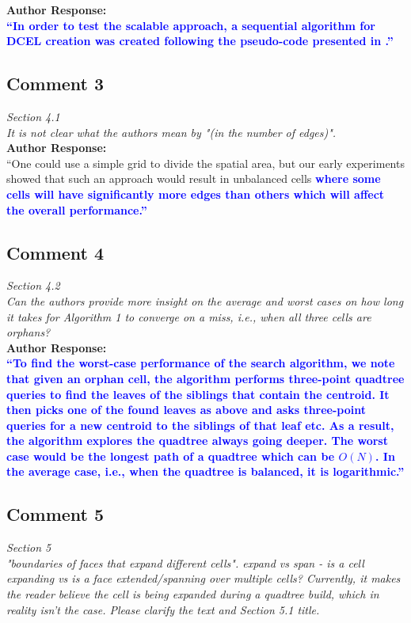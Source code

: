 \documentclass[10pt]{article}
\begin{document}
\textbf{Author Response:}\\

\textbf{\textcolor{blue}{
``In order to test the scalable approach, a sequential algorithm for DCEL creation was created following the pseudo-code presented in \cite{berg_computational_2008}.''
}}

\subsection*{Comment 3}
\textit{
Section 4.1\\
It is not clear what the authors mean by "(in the number of edges)".
} \\


\textbf{Author Response:}\\

``One could use a simple grid to divide the spatial area, but our early experiments showed that such an approach would result in unbalanced cells
\textbf{\textcolor{blue}{
where some cells will have significantly more edges than others which will affect the overall performance.''
}}

\subsection*{Comment 4}
\textit{
Section 4.2\\
Can the authors provide more insight on the average and worst cases on how long it takes for Algorithm 1 to converge on a miss, i.e., when all three cells are orphans?
} \\


\textbf{Author Response:}\\

\textbf{\textcolor{blue}{
``To find the worst-case performance of the search algorithm, we note that given an orphan cell, the algorithm performs three-point quadtree queries to find the leaves of the siblings that contain the centroid.
It then picks one of the found leaves as above and asks three-point queries for a new centroid to the siblings of that leaf etc. As a result, the algorithm explores the quadtree always going deeper. The worst case would be the longest path of a quadtree which can be $O(N)$. In the average case, i.e., when the quadtree is balanced, it is logarithmic.''
}}

\subsection*{Comment 5}
\textit{
Section 5\\
"boundaries of faces that expand different cells". expand vs span - is a cell expanding vs is a face extended/spanning over multiple cells? Currently, it makes the reader believe the cell is being expanded during a quadtree build, which in reality isn't the case. Please clarify the text and Section 5.1 title.
} \\
\end{document}

